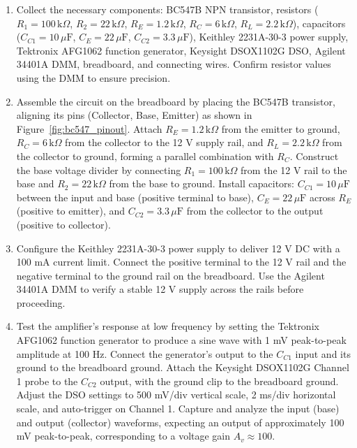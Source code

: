\documentclass[conference]{IEEEtran}
\begin{document}
\begin{enumerate}
    \item Collect the necessary components: BC547B NPN transistor, resistors ($R_1 = 100 \, \text{k}\Omega$, $R_2 = 22 \, \text{k}\Omega$, $R_E = 1.2 \, \text{k}\Omega$, $R_C = 6 \, \text{k}\Omega$, $R_L = 2.2 \, \text{k}\Omega$), capacitors ($C_{C1} = 10 \, \mu\text{F}$, $C_E = 22 \, \mu\text{F}$, $C_{C2} = 3.3 \, \mu\text{F}$), Keithley 2231A-30-3 power supply, Tektronix AFG1062 function generator, Keysight DSOX1102G DSO, Agilent 34401A DMM, breadboard, and connecting wires. Confirm resistor values using the DMM to ensure precision.

    \item Assemble the circuit on the breadboard by placing the BC547B transistor, aligning its pins (Collector, Base, Emitter) as shown in Figure~\ref{fig:bc547_pinout}. Attach $R_E = 1.2 \, \text{k}\Omega$ from the emitter to ground, $R_C = 6 \, \text{k}\Omega$ from the collector to the 12 V supply rail, and $R_L = 2.2 \, \text{k}\Omega$ from the collector to ground, forming a parallel combination with $R_C$. Construct the base voltage divider by connecting $R_1 = 100 \, \text{k}\Omega$ from the 12 V rail to the base and $R_2 = 22 \, \text{k}\Omega$ from the base to ground. Install capacitors: $C_{C1} = 10 \, \mu\text{F}$ between the input and base (positive terminal to base), $C_E = 22 \, \mu\text{F}$ across $R_E$ (positive to emitter), and $C_{C2} = 3.3 \, \mu\text{F}$ from the collector to the output (positive to collector).

    \item Configure the Keithley 2231A-30-3 power supply to deliver 12 V DC with a 100 mA current limit. Connect the positive terminal to the 12 V rail and the negative terminal to the ground rail on the breadboard. Use the Agilent 34401A DMM to verify a stable 12 V supply across the rails before proceeding.

    \item Test the amplifier’s response at low frequency by setting the Tektronix AFG1062 function generator to produce a sine wave with 1 mV peak-to-peak amplitude at 100 Hz. Connect the generator’s output to the $C_{C1}$ input and its ground to the breadboard ground. Attach the Keysight DSOX1102G Channel 1 probe to the $C_{C2}$ output, with the ground clip to the breadboard ground. Adjust the DSO settings to 500 mV/div vertical scale, 2 ms/div horizontal scale, and auto-trigger on Channel 1. Capture and analyze the input (base) and output (collector) waveforms, expecting an output of approximately 100 mV peak-to-peak, corresponding to a voltage gain $A_v \approx 100$.


\end{enumerate}
\end{document}
